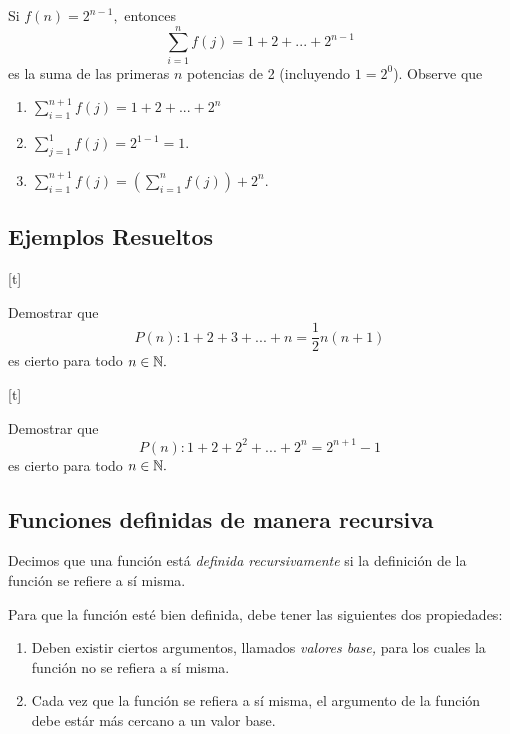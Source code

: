 	\begin{exmp}
		Si $f(n)=2^{n-1},$ entonces
		$$
		\sum_{i=1}^{n}f(j)=1+2+...+2^{n-1}
		$$ es la suma de las primeras $n$ potencias de 2 (incluyendo $1=2^{0}$).  Observe que 
		\begin{enumerate}
			\item $\sum_{i=1}^{n+1}f(j)=1+2+...+2^{n}$
			\item $\sum_{j=1}^{1}f(j)=2^{1-1}=1.$
			\item $\sum_{i=1}^{n+1}f(j)=\left( \sum_{i=1}^{n}f(j) \right)+2^{n}.$
		\end{enumerate}
		
	\end{exmp}
	


\subsection{Ejemplos Resueltos}

[t]
	\begin{exmp}
		Demostrar que $$P(n): 1+2+3+...+n=\frac{1}{2}n\left( n+1 \right)$$
		es cierto para todo $n \in \mathbb{N}.$
	\end{exmp}
	


[t]
	\begin{exmp}
		Demostrar que $$P(n): 1+2+2^{2}+...+2^{n}=2^{n+1}-1$$
		es cierto para todo $n \in \mathbb{N}.$
	\end{exmp}
	


\subsection{Funciones definidas de manera recursiva}


	Decimos que una funci\'on est\'a \emph{definida recursivamente} si la definici\'on de la funci\'on se refiere a s\'i misma.



	Para que la funci\'on est\'e bien definida, debe tener las siguientes dos propiedades:
	\begin{enumerate}
		\item Deben existir ciertos argumentos, llamados \emph{valores base,} para los cuales la funci\'on no se refiera a s\'i misma.
		\item Cada vez que la funci\'on se refiera a s\'i misma, el argumento de la funci\'on debe est\'ar m\'as cercano a un valor base.
	\end{enumerate}
	


